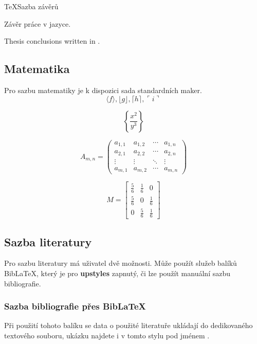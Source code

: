 \documentclass[
  master=false,               %
  font=sans,                  %
  printversion=false,         %
  joinlists=true,             %
  glossaries=true,            %
  figures=true,               %
  tables=true,                %
  sourcecodes=true,					  %
  theorems=true,						  %
  bibencoding=utf8,           %
  language=czech,             %
  encoding=utf8,              %
  field=inf,                  %
  index=true,                 %
]{updiplom}
\begin{document}
\begin{upcode}{TeX}{}{Sazba závěrů}
\begin{upconclusions}
Závěr práce v  jazyce.
\end{upconclusions}

\begin{upconclusions}[english]
Thesis conclusions written in .
\end{upconclusions}
\end{upcode}

\subsection{Matematika}
Pro sazbu matematiky je k dispozici sada standardních maker.
$$\langle f \rangle, \lfloor g \rfloor,
\lceil h \rceil, \ulcorner i \urcorner$$

$$\left\{\frac{x^2}{y^3}\right\}$$

$$
A_{m,n} =
 \begin{pmatrix}
  a_{1,1} & a_{1,2} & \cdots & a_{1,n} \\
  a_{2,1} & a_{2,2} & \cdots & a_{2,n} \\
  \vdots  & \vdots  & \ddots & \vdots  \\
  a_{m,1} & a_{m,2} & \cdots & a_{m,n}
 \end{pmatrix}
$$

$$
M = \begin{bmatrix}
       \frac{5}{6} & \frac{1}{6} & 0           \\[0.3em]
       \frac{5}{6} & 0           & \frac{1}{6} \\[0.3em]
       0           & \frac{5}{6} & \frac{1}{6}
     \end{bmatrix}
$$

\subsection{Sazba literatury}
Pro sazbu literatury má uživatel dvě možnosti. Může použít služeb balíků Bib\LaTeX{}, který je pro \textbf{upstyles} zapnutý, či lze použít manuální sazbu bibliografie.
\subsubsection{Sazba bibliografie přes Bib\LaTeX{}}
Při použití tohoto balíku se data o použité literatuře ukládají do dedikovaného textového souboru, ukázku najdete i v tomto stylu pod jménem .
\end{document}

